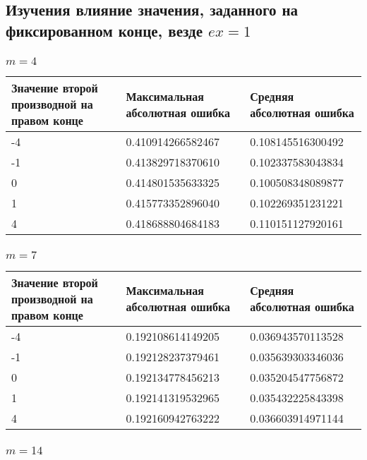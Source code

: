 \documentclass[paper=a4, fontsize=11pt]{scrartcl} %
\numberwithin{equation}{section} %
\numberwithin{figure}{section} %
\numberwithin{table}{section} %
\begin{document}
\subsection{Изучения влияние значения, заданного на фиксированном конце, везде $ex=1$}

\subsubsection{$m=4$}

\begin{tabular}{|p{4 cm}|p{4 cm}|p{4 cm}|}
\hline
	Значение второй производной на правом конце & Максимальная абсолютная ошибка & Средняя абсолютная ошибка\\
\hline
	-4 & 0.410914266582467 & 0.108145516300492\\
\hline
	-1 & 0.413829718370610 & 0.102337583043834\\
\hline
	0 & 0.414801535633325 & 0.100508348089877\\
\hline
	1 & 0.415773352896040 & 0.102269351231221\\
\hline
	4 & 0.418688804684183 & 0.110151127920161\\
\hline
\end{tabular}

\subsubsection{$m=7$}

\begin{tabular}{|p{4 cm}|p{4 cm}|p{4 cm}|}
\hline
	Значение второй производной на правом конце & Максимальная абсолютная ошибка & Средняя абсолютная ошибка\\
\hline
	-4 & 0.192108614149205 & 0.036943570113528\\
\hline
	-1 & 0.192128237379461 & 0.035639303346036\\
\hline
	0 & 0.192134778456213 & 0.035204547756872\\
\hline
	1 & 0.192141319532965 & 0.035432225843398\\
\hline
	4 & 0.192160942763222 & 0.036603914971144\\
\hline
\end{tabular}

\subsubsection{$m=14$}
	
\end{document}
